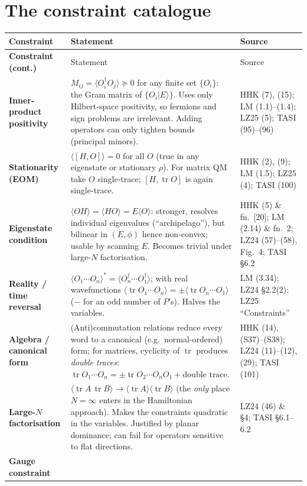 \documentclass[10pt,a4paper]{article}
\newcommand{\tr}{\operatorname{tr}}
\newcommand{\ev}[1]{\langle #1\rangle}
\begin{document}
\section{The constraint catalogue}
\renewcommand{\arraystretch}{1.25}
\noindent\begin{tabularx}{\textwidth}{@{}>{\bfseries}p{2.9cm}Xp{3.6cm}@{}}
\toprule Constraint & Statement & Source \\ \midrule \endfirsthead
\toprule Constraint (cont.) & Statement & Source \\ \midrule \endhead
\bottomrule\endlastfoot
Inner-product positivity &
$M_{ij}=\ev{O_i^\dagger O_j}\succeq 0$ for any finite set $\{O_i\}$: the Gram matrix of $\{O_i|E\rangle\}$. Uses only Hilbert-space positivity, so fermions and sign problems are irrelevant. Adding operators can only tighten bounds (principal minors). &
HHK (7), (15); LM (1.1)--(1.4); LZ25 (5); TASI (95)--(96) \\
Stationarity (EOM) &
$\ev{[H,O]}=0$ for all $O$ (true in any eigenstate or stationary $\rho$). For matrix QM take $O$ single-trace; $[H,\tr O]$ is again single-trace. &
HHK (2), (9); LM (1.5); LZ25 (4); TASI (100) \\
Eigenstate condition &
$\ev{OH}=\ev{HO}=E\ev{O}$: stronger, resolves individual eigenvalues (``archipelago''), but bilinear in $(E,\phi)$ hence non-convex; usable by scanning $E$. Becomes trivial under large-$N$ factorisation. &
HHK (5) \& fn.\ [20]; LM (2.14) \& fn.\ 2; LZ24 (57)--(58), Fig.\ 4; TASI \S6.2 \\
Reality / time reversal &
$\ev{O_1\cdots O_n}^*=\ev{O_n^\dagger\cdots O_1^\dagger}$; with real wavefunctions $\ev{\tr O_1\cdots O_n}=\pm\ev{\tr O_n\cdots O_1}$ ($-$ for an odd number of $P$'s). Halves the variables. &
LM (3.34); LZ24 \S2.2(2); LZ25 ``Constraints'' \\
Algebra / canonical form &
(Anti)commutation relations reduce every word to a canonical (e.g.\ normal-ordered) form; for matrices, cyclicity of $\tr$ produces \emph{double traces}: $\tr O_1\cdots O_n=\pm\tr O_2\cdots O_nO_1+\text{double trace}$. &
HHK (14), (S37)--(S38); LZ24 (11)--(12), (29); TASI (101) \\
Large-$N$ factorisation &
$\ev{\tr A\,\tr B}\to\ev{\tr A}\ev{\tr B}$ (the \emph{only} place $N=\infty$ enters in the Hamiltonian approach). Makes the constraints quadratic in the variables. Justified by planar dominance; can fail for operators sensitive to flat directions. &
LZ24 (46) \& \S4; TASI \S6.1--6.2 \\
Gauge constraint &

\end{tabularx}
\end{document}
